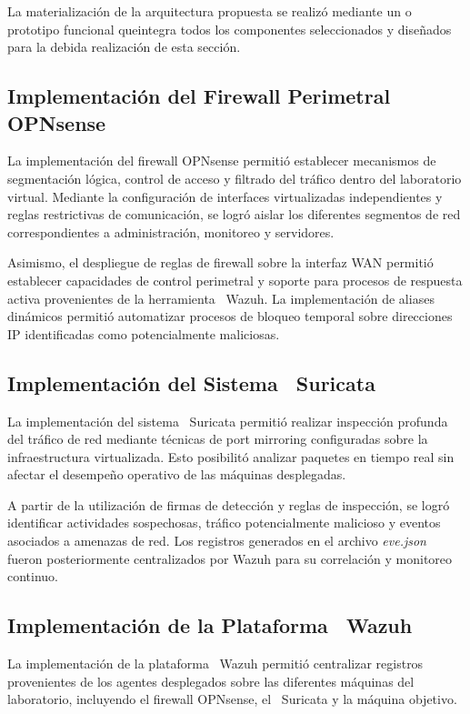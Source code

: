 La materialización de la arquitectura propuesta se realizó mediante un \PMV o prototipo funcional queintegra todos los componentes
seleccionados y diseñados para la debida realización de esta sección.

\subsection{Implementación del Firewall Perimetral OPNsense}

La implementación del firewall OPNsense permitió establecer mecanismos de segmentación lógica, control de acceso y filtrado del tráfico 
dentro del laboratorio virtual. Mediante la configuración de interfaces virtualizadas independientes y reglas restrictivas de comunicación, 
se logró aislar los diferentes segmentos de red correspondientes a administración, monitoreo y servidores.

Asimismo, el despliegue de reglas de firewall sobre la interfaz WAN permitió establecer capacidades de control perimetral y soporte para 
procesos de respuesta activa provenientes de la herramienta \SIEM\ Wazuh. La implementación de aliases dinámicos permitió automatizar 
procesos de bloqueo temporal sobre direcciones IP identificadas como potencialmente maliciosas.

\subsection{Implementación del Sistema \IDPS\ Suricata}

La implementación del sistema \IDPS\ Suricata permitió realizar inspección profunda del tráfico de red mediante técnicas de port mirroring 
configuradas sobre la infraestructura virtualizada. Esto posibilitó analizar paquetes en tiempo real sin afectar el desempeño operativo de 
las máquinas desplegadas.

A partir de la utilización de firmas de detección y reglas de inspección, se logró identificar actividades sospechosas, tráfico 
potencialmente malicioso y eventos asociados a amenazas de red. Los registros generados en el archivo \textit{eve.json} fueron 
posteriormente centralizados por Wazuh para su correlación y monitoreo continuo.

\subsection{Implementación de la Plataforma \SIEM\ Wazuh}

La implementación de la plataforma \SIEM\ Wazuh permitió centralizar registros provenientes de los agentes desplegados sobre las diferentes 
máquinas del laboratorio, incluyendo el firewall OPNsense, el \IDPS\ Suricata y la máquina objetivo.

